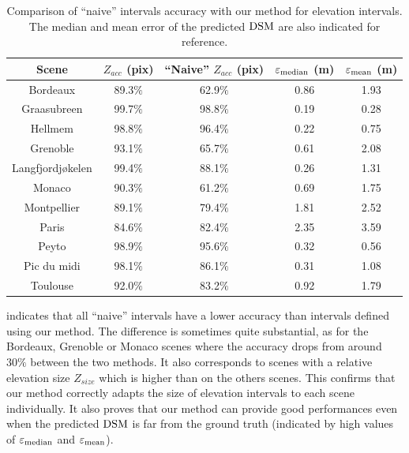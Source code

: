 \begin{table}[ht]
    \centering
    \begin{tabular}{|c||c|c|c|c|}
        \hline
        Scene & $Z_{acc}$ (pix) & ``Naive'' $Z_{acc}$ (pix) & $\varepsilon_{\operatorname*{median}}$ (m) & $\varepsilon_{\operatorname*{mean}}$ (m)
        \\\hline\hline
        Bordeaux & 89.3$\%$ & 62.9$\%$ & 0.86 & 1.93\\\hline
        Graasubreen & 99.7$\%$ & 98.8$\%$ & 0.19 & 0.28\\\hline
        Hellmem & 98.8$\%$ & 96.4$\%$ & 0.22 & 0.75\\\hline
        Grenoble & 93.1$\%$ & 65.7$\%$ & 0.61 & 2.08\\\hline
        Langfjordjøkelen & 99.4$\%$ & 88.1$\%$ & 0.26 & 1.31\\\hline
        Monaco & 90.3$\%$ & 61.2$\%$ & 0.69 & 1.75\\\hline
        Montpellier & 89.1$\%$ & 79.4$\%$ & 1.81 & 2.52\\\hline
        Paris & 84.6$\%$ & 82.4$\%$ & 2.35 & 3.59\\\hline
        Peyto & 98.9$\%$ & 95.6$\%$ & 0.32 & 0.56\\\hline
        Pic du midi & 98.1$\%$ & 86.1$\%$ & 0.31 & 1.08\\\hline
        Toulouse & 92.0$\%$ & 83.2$\%$ & 0.92 & 1.79\\\hline
    \end{tabular}
    \caption{Comparison of ``naive'' intervals accuracy with our method for elevation intervals. The median and mean error of the predicted $\mathrm{DSM}$ are also indicated for reference.}
    \label{tab:naive_accuracy}
\end{table}
 indicates that all ``naive'' intervals have a lower accuracy than intervals defined using our method. The difference is sometimes quite substantial, as for the Bordeaux, Grenoble or Monaco scenes where the accuracy drops from around $30\%$ between the two methods. It also corresponds to scenes with a relative elevation size $Z_{size}$ which is higher than on the others scenes. This confirms that our method correctly adapts the size of elevation intervals to each scene individually. It also proves that our method can provide good performances even when the predicted $\mathrm{DSM}$ is far from the ground truth (indicated by high values of $\varepsilon_{\operatorname*{median}}$ and $\varepsilon_{\operatorname*{mean}}$). 


